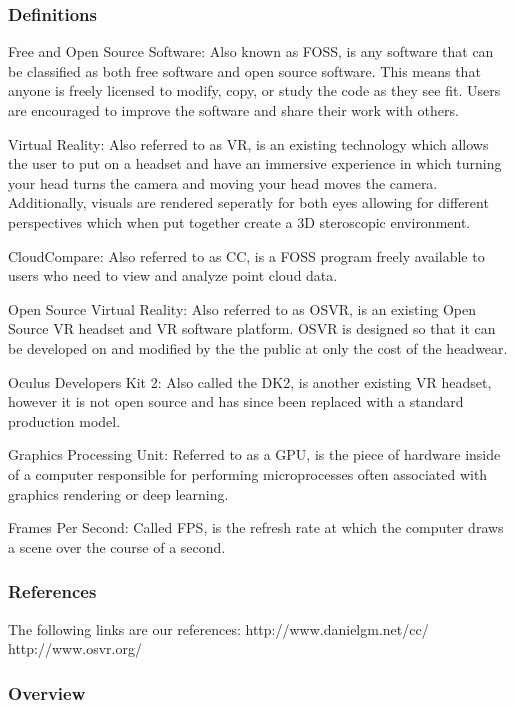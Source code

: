 \subsubsection{Definitions}

Free and Open Source Software: Also known as FOSS, is any software that can be classified as both free software and open source software. This means that anyone is freely licensed to modify, copy, or study the code as they see fit. 
Users are encouraged to improve the software and share their work with others.

Virtual Reality: Also referred to as VR, is an existing technology which allows the user to put on a headset and have an immersive experience in which turning your head turns the camera and moving your head moves the camera.
Additionally, visuals are rendered seperatly for both eyes allowing for different perspectives which when put together create a 3D steroscopic environment.

CloudCompare: Also referred to as CC, is a FOSS program freely available to users who need to view and analyze point cloud data.

Open Source Virtual Reality: Also referred to as OSVR, is an existing Open Source VR headset and VR software platform. OSVR is designed so that it can be developed on and modified by the the public at only the cost of the headwear.

Oculus Developers Kit 2: Also called the DK2, is another existing VR headset, however it is not open source and has since been replaced with a standard production model.

Graphics Processing Unit: Referred to as a GPU, is the piece of hardware inside of a computer responsible for performing microprocesses often associated with graphics rendering or deep learning.

Frames Per Second: Called FPS, is the refresh rate at which the computer draws a scene over the course of a second.

\subsubsection{References}

The following links are our references:
  http://www.danielgm.net/cc/
  http://www.osvr.org/

\subsubsection{Overview}

